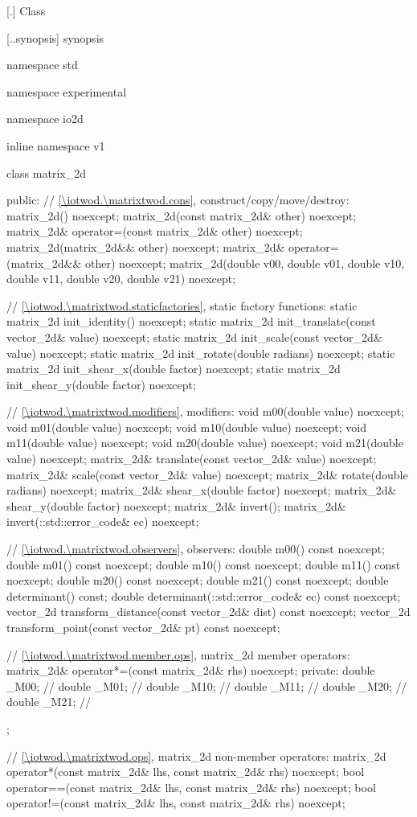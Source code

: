  [\iotwod.\matrixtwod] {Class }

 [\iotwod.\matrixtwod.synopsis] { synopsis}

\begin{codeblock}
namespace std { namespace experimental { namespace io2d { inline namespace v1 {
  class matrix_2d {
  public:
    // \ref{\iotwod.\matrixtwod.cons}, construct/copy/move/destroy:
    matrix_2d() noexcept;
    matrix_2d(const matrix_2d& other) noexcept;
    matrix_2d& operator=(const matrix_2d& other) noexcept;
    matrix_2d(matrix_2d&& other) noexcept;
    matrix_2d& operator=(matrix_2d&& other) noexcept;
    matrix_2d(double v00, double v01, double v10, double v11,
      double v20, double v21) noexcept;
    
    // \ref{\iotwod.\matrixtwod.staticfactories}, static factory functions:
    static matrix_2d init_identity() noexcept;
    static matrix_2d init_translate(const vector_2d& value) noexcept;
    static matrix_2d init_scale(const vector_2d& value) noexcept;
    static matrix_2d init_rotate(double radians) noexcept;
    static matrix_2d init_shear_x(double factor) noexcept;
    static matrix_2d init_shear_y(double factor) noexcept;
    
    // \ref{\iotwod.\matrixtwod.modifiers}, modifiers:
    void m00(double value) noexcept;
    void m01(double value) noexcept;
    void m10(double value) noexcept;
    void m11(double value) noexcept;
    void m20(double value) noexcept;
    void m21(double value) noexcept;
    matrix_2d& translate(const vector_2d& value) noexcept;
    matrix_2d& scale(const vector_2d& value) noexcept;
    matrix_2d& rotate(double radians) noexcept;
    matrix_2d& shear_x(double factor) noexcept;
    matrix_2d& shear_y(double factor) noexcept;
    matrix_2d& invert();
    matrix_2d& invert(::std::error_code& ec) noexcept;
    
    // \ref{\iotwod.\matrixtwod.observers}, observers:
    double m00() const noexcept;
    double m01() const noexcept;
    double m10() const noexcept;
    double m11() const noexcept;
    double m20() const noexcept;
    double m21() const noexcept;
    double determinant() const;
    double determinant(::std::error_code& ec) const noexcept;
    vector_2d transform_distance(const vector_2d& dist) const noexcept;
    vector_2d transform_point(const vector_2d& pt) const noexcept;
    
    // \ref{\iotwod.\matrixtwod.member.ops}, matrix_2d member operators:
    matrix_2d& operator*=(const matrix_2d& rhs) noexcept;
  private:
    double _M00; // \expos
    double _M01; // \expos
    double _M10; // \expos
    double _M11; // \expos
    double _M20; // \expos
    double _M21; // \expos
  };
    
  // \ref{\iotwod.\matrixtwod.ops}, matrix_2d non-member operators:
  matrix_2d operator*(const matrix_2d& lhs, const matrix_2d& rhs) noexcept;
  bool operator==(const matrix_2d& lhs, const matrix_2d& rhs) noexcept;
  bool operator!=(const matrix_2d& lhs, const matrix_2d& rhs) noexcept;
} } } }
\end{codeblock}

